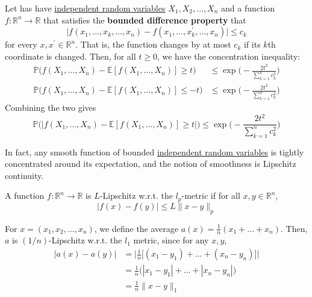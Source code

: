     \begin{theorem}
      \label{thm:bounded-difference-inequality}
      Let has have \hyperref[def:independent-random-variables]{independent random variables} $X_1, X_2, \ldots, X_n$ and a function $f: \mathbb{R}^n \to \mathbb{R}$ that satisfies the \textbf{bounded difference property} that 
      \begin{equation}
        \big| f(x_1, \ldots, x_k, \ldots, x_n) - f(x_1, \ldots, x_k^\prime, \ldots, x_n) \big| \leq c_k
      \end{equation}
      for every $x, x^\prime \in \mathbb{R}^n$. That is, the function changes by at most $c_k$ if its $k$th coordinate is changed. Then, for all $t \geq 0$, we have the concentration inequality: 
      \begin{align*}
        \mathbb{P} \big( f(X_1, \ldots, X_n) - \mathbb{E}[ f(X_1, \ldots, X_n)] \geq t \big) & \leq \exp \bigg(- \frac{2t^2}{\sum_{k=1}^n c_k^2} \bigg) \\
        \mathbb{P} \big( f(X_1, \ldots, X_n) - \mathbb{E}[ f(X_1, \ldots, X_n)] \leq -t \big) & \leq \exp \bigg(- \frac{2t^2}{\sum_{k=1}^n c_k^2} \bigg)
      \end{align*}
      Combining the two gives 
      \begin{equation}
        \mathbb{P} \big( \big| f(X_1, \ldots, X_n) - \mathbb{E}[ f(X_1, \ldots, X_n)] \geq t \big| \big) \leq \exp \bigg(- \frac{2t^2}{\sum_{k=1}^n c_k^2} \bigg)
      \end{equation}
    \end{theorem}

    In fact, any smooth function of bounded \hyperref[def:independent-random-variables]{independent random variables} is tightly concentrated around its expectation, and the notion of smoothness is Lipschitz continuity. 

    \begin{definition}
      \label{def:l-lipschitz-with-respect-to-the-lp-metric}
      A function $f: \mathbb{R}^n \to \mathbb{R}$ is $L$-Lipschitz w.r.t. the $l_p$-metric if for all $x, y \in \mathbb{R}^n$, 
      \begin{equation}
        |f(x) - f(y)| \leq L \|x - y\|_p
      \end{equation}
    \end{definition}

    \begin{example}
      \label{ex:the-average-is-lipschitz}
      For $x = (x_1, x_2, \ldots, x_n)$, we define the average $a(x) = \frac{1}{n} (x_1 + \ldots + x_n)$. Then, $a$ is $(1/n)$-Lipschitz w.r.t. the $l_1$ metric, since for any $x, y$, 
      \begin{align*}
        |a(x) - a(y)| & = \bigg| \frac{1}{n} \big[ (x_1 - y_1) + \ldots + (x_n - y_n) \big] \bigg| \\
        & = \frac{1}{n} \big( |x_1 - y_1| + \ldots + |x_n - y_n| \big) \\
        & = \frac{1}{n} \|x - y \|_1
      \end{align*}
    \end{example}


